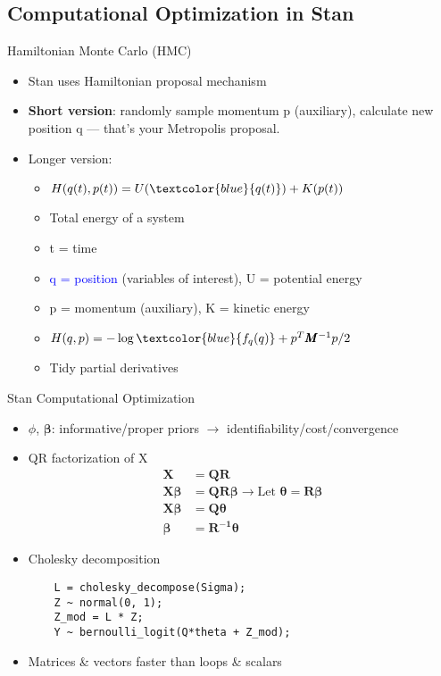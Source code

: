 \documentclass{beamer}
\begin{document}
\subsection{Computational Optimization in Stan}

\begin{frame}{Hamiltonian Monte Carlo (HMC)}
\begin{itemize}
\addtolength{\itemsep}{0.5\baselineskip}
\item Stan uses Hamiltonian proposal mechanism
\item {\bf Short version}: randomly sample momentum p (auxiliary), calculate new position q  --- that's your Metropolis proposal.
\item Longer version:
  \begin{itemize}
  \addtolength{\itemsep}{0.5\baselineskip}
  \item $H(q(t),p(t)) = U(\textcolor{blue}{q(t)}) + K(p(t))$
  \item Total energy of a system
  \item t = time
  \item \textcolor{blue}{q = position} (variables of interest), U = potential energy
  \item p = momentum (auxiliary), K = kinetic energy
  \item $H(q,p) = -\log \textcolor{blue}{f_{q}(q)} + p^{T}\pmb{M}^{-1}p/2$
  \item Tidy partial derivatives
  \end{itemize}

\end{itemize}
\end{frame}


\begin{frame}[fragile]{Stan Computational Optimization}{}
\begin{itemize}
\addtolength{\itemsep}{0.5\baselineskip}
\item  $\phi$, $\pmb{\beta}$: informative/proper priors $\rightarrow$ identifiability/cost/convergence
\item QR factorization of X
\begin{align*}
\pmb{X} &= \pmb{QR} \\
\pmb{X \beta} &= \pmb{QR \beta} \rightarrow \text{Let } \pmb{\theta} = \pmb{R \beta} \\
\pmb{X \beta} &= \pmb{Q \theta} \\
\pmb{\beta} &= \pmb{R^{-1}\theta}
\end{align*}
\item Cholesky decomposition
    \begin{verbatim}
    L = cholesky_decompose(Sigma);
    Z ~ normal(0, 1);
    Z_mod = L * Z;
    Y ~ bernoulli_logit(Q*theta + Z_mod);
    \end{verbatim}
\item Matrices \& vectors faster than loops \& scalars
\end{itemize}
\end{frame}
\end{document}
